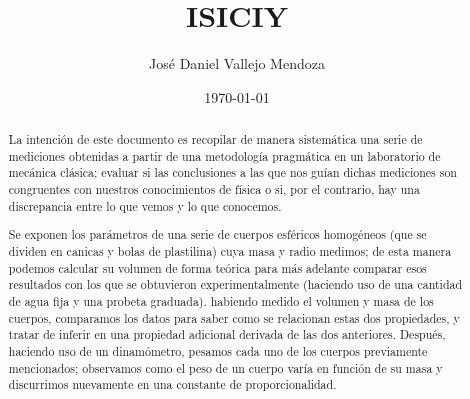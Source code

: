\documentclass{article}
\title{ISICIY}
\author{José Daniel Vallejo Mendoza}
\date{\today}
\begin{document}
\maketitle


\begin{abstract}

 La intención de este documento es recopilar de manera sistemática una serie de mediciones obtenidas a partir de una metodología pragmática en un laboratorio de mecánica clásica; evaluar si las conclusiones a las que nos guían dichas mediciones son congruentes con nuestros conocimientos de física o si, por el contrario, hay una discrepancia entre lo que vemos y lo que conocemos. \par
Se exponen los parámetros de una serie de cuerpos esféricos homogéneos (que se dividen en canicas y bolas de plastilina) cuya masa y radio medimos; de esta manera podemos calcular su volumen de forma teórica para más adelante comparar esos resultados con los que se obtuvieron experimentalmente (haciendo uso de una cantidad de agua fija y una probeta graduada). habiendo medido el volumen y masa de los cuerpos, comparamos los datos para saber como se relacionan estas dos propiedades, y tratar de inferir en una propiedad adicional derivada de las dos anteriores. 
Después, haciendo uso de un dinamómetro, pesamos cada uno de los cuerpos previamente mencionados; observamos como el peso de un cuerpo varía en función de su masa y discurrimos nuevamente en una constante de proporcionalidad.
\end{abstract}
\end{document}
